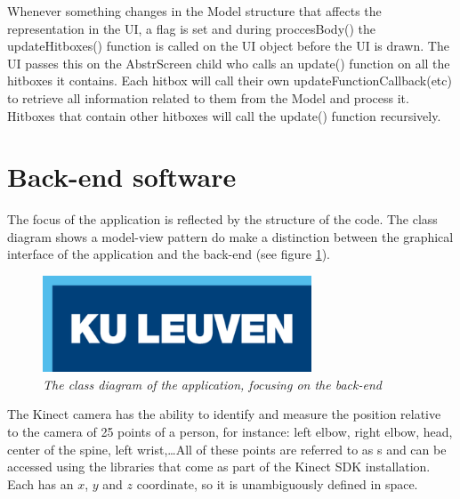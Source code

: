 Whenever something changes in the Model structure that affects the representation in the UI, a flag is set and during proccesBody() the updateHitboxes() function is called on the UI object before the UI is drawn. The UI passes this on the Abstr\textunderscore Screen child who calls an update() function on all the hitboxes it contains. Each hitbox will call their own updateFunctionCallback(etc) to retrieve all information related to them from the Model and process it. Hitboxes that contain other hitboxes will call the update() function recursively.



\section{Back-end software}
\label{section: Back-end software}



The focus of the application is reflected by the structure of the code. The class diagram shows a model-view pattern do make a distinction between the graphical interface of the application and the back-end (see figure \ref{fig: backend_classdiagram}).\\

\begin{figure}[H]
\begin{center}
\includegraphics[width=8cm]{KUL.png}
\caption{\emph{The class diagram of the application, focusing on the back-end}}
\label{fig: backend_classdiagram}
\end{center}
\end{figure}

The Kinect camera has the ability to identify and measure the position relative to the camera of 25 points of a person, for instance: left elbow, right elbow, head, center of the spine, left wrist,\ldots All of these points are referred to as s and can be accessed using the libraries that come as part of the Kinect SDK installation. Each  has an $x$, $y$ and $z$ coordinate, so it is unambiguously defined in space.\\


